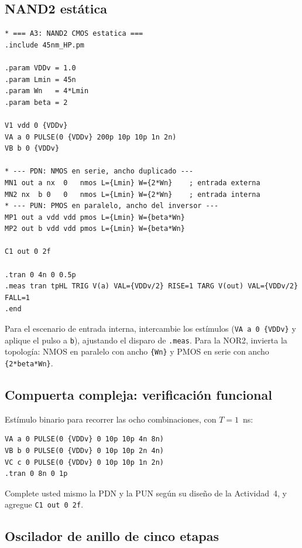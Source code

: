 \documentclass[11pt,a4paper]{article}
\begin{document}
\subsection{NAND2 estática}
\label{sec:a3}

\begin{lstlisting}
* === A3: NAND2 CMOS estatica ===
.include 45nm_HP.pm

.param VDDv = 1.0
.param Lmin = 45n
.param Wn   = 4*Lmin
.param beta = 2

V1 vdd 0 {VDDv}
VA a 0 PULSE(0 {VDDv} 200p 10p 10p 1n 2n)
VB b 0 {VDDv}

* --- PDN: NMOS en serie, ancho duplicado ---
MN1 out a nx  0   nmos L={Lmin} W={2*Wn}    ; entrada externa
MN2 nx  b 0   0   nmos L={Lmin} W={2*Wn}    ; entrada interna
* --- PUN: PMOS en paralelo, ancho del inversor ---
MP1 out a vdd vdd pmos L={Lmin} W={beta*Wn}
MP2 out b vdd vdd pmos L={Lmin} W={beta*Wn}

C1 out 0 2f

.tran 0 4n 0 0.5p
.meas tran tpHL TRIG V(a) VAL={VDDv/2} RISE=1 TARG V(out) VAL={VDDv/2} FALL=1
.end
\end{lstlisting}

Para el escenario de entrada interna, intercambie los estímulos (\lstinline|VA a 0 {VDDv}| y aplique el pulso a \texttt{b}), ajustando el disparo de \lstinline|.meas|. Para la NOR2, invierta la topología: NMOS en paralelo con ancho \lstinline|{Wn}| y PMOS en serie con ancho \lstinline|{2*beta*Wn}|.

\subsection{Compuerta compleja: verificación funcional}
\label{sec:a4}

Estímulo binario para recorrer las ocho combinaciones, con $T=1$~ns:

\begin{lstlisting}
VA a 0 PULSE(0 {VDDv} 0 10p 10p 4n 8n)
VB b 0 PULSE(0 {VDDv} 0 10p 10p 2n 4n)
VC c 0 PULSE(0 {VDDv} 0 10p 10p 1n 2n)
.tran 0 8n 0 1p
\end{lstlisting}

Complete usted mismo la PDN y la PUN según su diseño de la Actividad~4, y agregue \lstinline|C1 out 0 2f|.

\subsection{Oscilador de anillo de cinco etapas}
\label{sec:a5}
\end{document}
